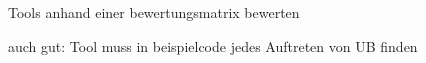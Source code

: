 Tools anhand einer bewertungsmatrix bewerten

auch gut: Tool muss in beispielcode jedes Auftreten von UB finden